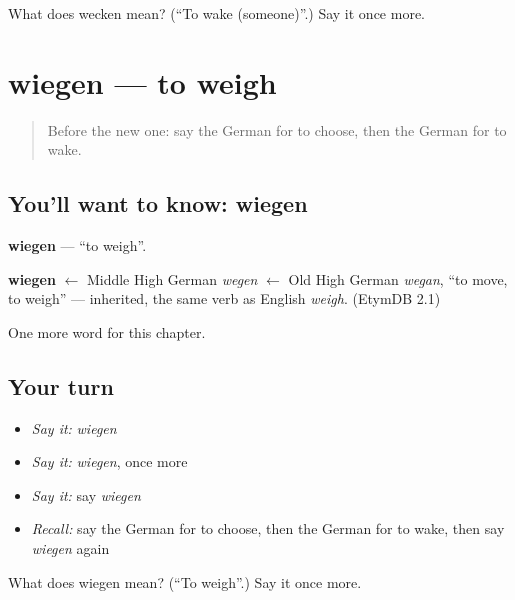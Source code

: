 \begin{tcolorbox}[breakable,colback=teal!4,colframe=teal!35!black,title={Before you move on}]
What does wecken mean? (\textquotedblleft{}To wake (someone)\textquotedblright{}.) Say it once more.
\end{tcolorbox}
\section[wiegen]{wiegen — to weigh}

\label{lesson:GE-C191-wiegen}



\begin{quote}
Before the new one: say the German for to choose, then the German for to wake.
\end{quote}

\subsection*{You'll want to know: wiegen}
\textbf{wiegen} — \textquotedblleft{}to weigh\textquotedblright{}.

\begin{cousinweb}
\textbf{wiegen} $\leftarrow$ Middle High German \emph{wegen} $\leftarrow$ Old High German \emph{wegan}, \textquotedblleft{}to move, to weigh\textquotedblright{} — inherited, the same verb as English \emph{weigh}. (EtymDB 2.1)
\end{cousinweb}

\begin{grammarlens}[title={What you've built}]
One more word for this chapter.
\end{grammarlens}

\subsection*{Your turn}
\begin{itemize}
\raggedright
  \item \emph{Say it:} \emph{wiegen}
  \item \emph{Say it:} \emph{wiegen}, once more
  \item \emph{Say it:} say \emph{wiegen}
  \item \emph{Recall:} say the German for to choose, then the German for to wake, then say \emph{wiegen} again
\end{itemize}

\begin{tcolorbox}[breakable,colback=teal!4,colframe=teal!35!black,title={Before you move on}]
What does wiegen mean? (\textquotedblleft{}To weigh\textquotedblright{}.) Say it once more.
\end{tcolorbox}
